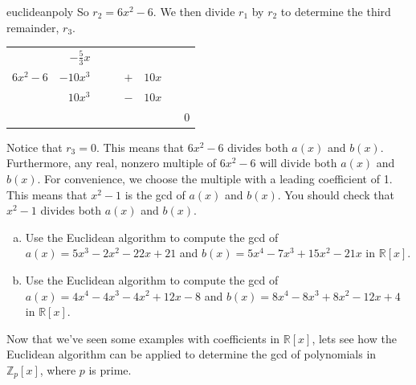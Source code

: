 \begin{example}{euclideanpoly}
So $r_2 =6x^2-6$. We then divide $r_1$ by $r_2$ to determine the third remainder, $r_3$.

\begin{center}
\begin{tabular}{rrcrcrcr}
        &  $-\frac{5}{3}x$         &           &           &             &         &  &         \\ \cline{2-8}
 \multicolumn{1}{r|}{$6x^2-6$}
        &    $-10x^3$   &        &   &  $+$  &  $10x$ &   &  \\
        &  $10x^3$ &          &                    &  $-$   & $10x$    &         &             \\ \cline{2-8}
        &                  &    & &    &  &    &  0  \\
 \end{tabular}
\end{center}

Notice that $r_3=0$. This means that $6x^2 -6$ divides both $a(x)$ and $b(x)$. Furthermore, any real, nonzero multiple of $6x^2 -6$ will divide both $a(x)$ and $b(x)$. For convenience, we choose the multiple with a leading coefficient of 1. This means that $x^2-1$ is the gcd of $a(x)$ and $b(x)$. You should check that $x^2-1$ divides both $a(x)$ and $b(x)$.
\end{example}

\begin{exercise}{}
\begin{enumerate}[(a)]
\item
Use the Euclidean algorithm to compute the gcd of $a(x)=5x^3-2x^2-22x+21$ and  $b(x)=5x^4-7x^3+15x^2-21x$ in $\mathbb{R}[x]$.
\item
Use the Euclidean algorithm to compute the gcd of $a(x)=4x^4-4x^3-4x^2+12x-8$ and  $b(x)=8x^4-8x^3+8x^2-12x+4$ in $\mathbb{R}[x]$. 
\end{enumerate}
\end{exercise}

Now that we've seen some examples with coefficients in $\mathbb{R}[x]$, lets see how the Euclidean algorithm can be applied to determine the gcd of polynomials in $\mathbb{Z}_p[x]$, where $p$ is prime. 

